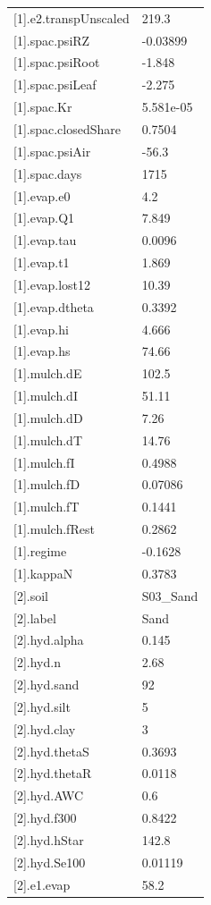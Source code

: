 {\begin{longtable}{p{}p{}}
{}[1].e2.transpUnscaled & 219.3\\
{}[1].spac.psiRZ & -0.03899\\
{}[1].spac.psiRoot & -1.848\\
{}[1].spac.psiLeaf & -2.275\\
{}[1].spac.Kr & 5.581e-05\\
{}[1].spac.closedShare & 0.7504\\
{}[1].spac.psiAir & -56.3\\
{}[1].spac.days & 1715\\
{}[1].evap.e0 & 4.2\\
{}[1].evap.Q1 & 7.849\\
{}[1].evap.tau & 0.0096\\
{}[1].evap.t1 & 1.869\\
{}[1].evap.lost12 & 10.39\\
{}[1].evap.dtheta & 0.3392\\
{}[1].evap.hi & 4.666\\
{}[1].evap.hs & 74.66\\
{}[1].mulch.dE & 102.5\\
{}[1].mulch.dI & 51.11\\
{}[1].mulch.dD & 7.26\\
{}[1].mulch.dT & 14.76\\
{}[1].mulch.fI & 0.4988\\
{}[1].mulch.fD & 0.07086\\
{}[1].mulch.fT & 0.1441\\
{}[1].mulch.fRest & 0.2862\\
{}[1].regime & -0.1628\\
{}[1].kappaN & 0.3783\\
{}[2].soil & S03\_Sand\\
{}[2].label & Sand\\
{}[2].hyd.alpha & 0.145\\
{}[2].hyd.n & 2.68\\
{}[2].hyd.sand & 92\\
{}[2].hyd.silt & 5\\
{}[2].hyd.clay & 3\\
{}[2].hyd.thetaS & 0.3693\\
{}[2].hyd.thetaR & 0.0118\\
{}[2].hyd.AWC & 0.6\\
{}[2].hyd.f300 & 0.8422\\
{}[2].hyd.hStar & 142.8\\
{}[2].hyd.Se100 & 0.01119\\
{}[2].e1.evap & 58.2\\

\end{longtable}}
